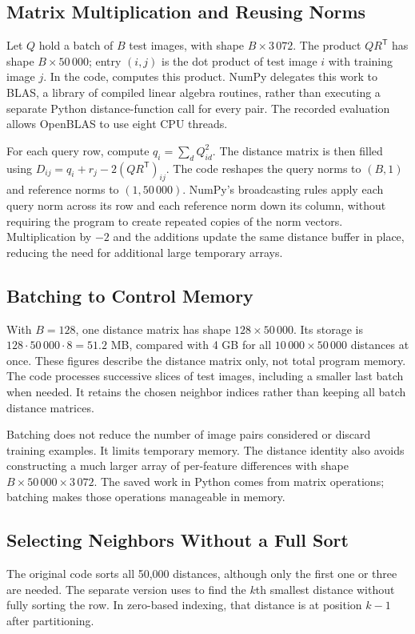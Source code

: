 \subsection{Matrix Multiplication and Reusing Norms}
Let $Q$ hold a batch of $B$ test images, with shape $B\times3\,072$.
The product $QR^{\mathsf T}$ has shape $B\times50\,000$; entry $(i,j)$
is the dot product of test image $i$ with training image $j$. In the code,
 computes this product. NumPy delegates this
work to BLAS, a library of compiled linear algebra routines, rather than
executing a separate Python distance-function call for every pair.
The recorded evaluation allows OpenBLAS to use eight CPU threads.

For each query row, compute $q_i=\sum_d Q_{id}^2$. The distance matrix is
then filled using $D_{ij}=q_i+r_j-2(QR^{\mathsf T})_{ij}$.
The code reshapes the query norms to $(B,1)$ and reference norms to
$(1,50\,000)$. NumPy's broadcasting rules apply each query norm across
its row and each reference norm down its column, without requiring the
program to create repeated copies of the norm vectors. Multiplication by
$-2$ and the additions update the same distance buffer in place, reducing
the need for additional large temporary arrays.

\subsection{Batching to Control Memory}
With $B=128$, one distance matrix has shape $128\times50\,000$.
Its  storage is $128\cdot50\,000\cdot8=51.2$ MB, compared
with 4 GB for all $10\,000\times50\,000$ distances at once. These figures
describe the distance matrix only, not total program memory.
The code processes successive slices of test images, including a smaller
last batch when needed. It retains the chosen neighbor indices rather
than keeping all batch distance matrices.

Batching does not reduce the number of image pairs considered or discard
training examples. It limits temporary memory. The distance identity also
avoids constructing a much larger array of per-feature differences with
shape $B\times50\,000\times3\,072$. The saved work in Python comes from
matrix operations; batching makes those operations manageable in memory.

\subsection{Selecting Neighbors Without a Full Sort}
The original code sorts all 50,000 distances, although only the first one
or three are needed. The separate version uses  to find
the $k$th smallest distance without fully sorting the row. In zero-based
indexing, that distance is at position $k-1$ after partitioning.

